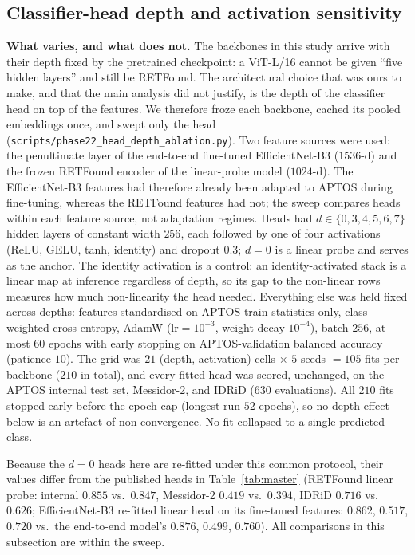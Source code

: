 \subsection{Classifier-head depth and activation sensitivity}
\label{sec:results-headdepth}

\textbf{What varies, and what does not.} The backbones in this study arrive with
their depth fixed by the pretrained checkpoint: a ViT-L/16 cannot be given
``five hidden layers'' and still be RETFound. The architectural choice that was
ours to make, and that the main analysis did not justify, is the depth of the
classifier head on top of the features. We therefore froze each backbone, cached
its pooled embeddings once, and swept only the head
(\texttt{scripts/phase22\_head\_depth\_ablation.py}). Two feature sources were
used: the penultimate layer of the end-to-end fine-tuned EfficientNet-B3
($1536$-d) and the frozen RETFound encoder of the linear-probe model ($1024$-d).
The EfficientNet-B3 features had therefore already been adapted to APTOS during
fine-tuning, whereas the RETFound features had not; the sweep compares heads
within each feature source, not adaptation regimes. Heads had
$d\in\{0,3,4,5,6,7\}$ hidden layers of constant width $256$, each followed by one
of four activations (ReLU, GELU, tanh, identity) and dropout $0.3$; $d=0$ is a
linear probe and serves as the anchor. The identity activation is a control: an
identity-activated stack is a linear map at inference regardless of depth, so its
gap to the non-linear rows measures how much non-linearity the head needed.
Everything else was held fixed across depths: features standardised on APTOS-train
statistics only, class-weighted cross-entropy, AdamW ($\text{lr}=10^{-3}$, weight
decay $10^{-4}$), batch $256$, at most $60$ epochs with early stopping on
APTOS-validation balanced accuracy (patience $10$). The grid was
$21$ (depth, activation) cells $\times$ $5$ seeds $=105$ fits per backbone
($210$ in total), and every fitted head was scored, unchanged, on the APTOS
internal test set, Messidor-2, and IDRiD ($630$ evaluations). All $210$ fits
stopped early before the epoch cap (longest run $52$ epochs), so no depth effect
below is an artefact of non-convergence. No fit collapsed to a single predicted
class.

Because the $d=0$ heads here are re-fitted under this common protocol, their
values differ from the published heads in Table~\ref{tab:master} (RETFound linear
probe: internal $0.855$ vs.\ $0.847$, Messidor-2 $0.419$ vs.\ $0.394$, IDRiD
$0.716$ vs.\ $0.626$; EfficientNet-B3 re-fitted linear head on its fine-tuned
features: $0.862$, $0.517$, $0.720$ vs.\ the end-to-end model's $0.876$,
$0.499$, $0.760$). All comparisons in this subsection are within the sweep.


